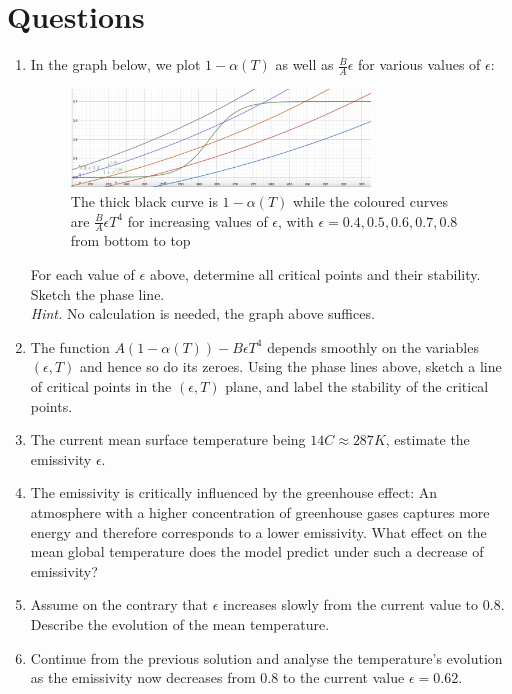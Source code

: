 \documentclass[10pt, letterpaper, answer]{exam}
\begin{document}
\newpage

\section{Questions}

\begin{enumerate}
\item In the graph below, we plot $1-\alpha(T)$ as well as $\frac{B}{A}\epsilon$ for various values of $\epsilon$:

\begin{figure}[!h]\begin{center}
    \includegraphics[width=0.75\textwidth]{Bifurcation.png}
    \caption{The thick black curve is $1-\alpha(T)$ while the coloured curves are $\frac{B}{A}\epsilon T^4$ for increasing values of $\epsilon$, with $\epsilon =0.4,0.5,0.6,0.7,0.8$ from bottom to top} 
\end{center}
\label{TheGraph}\end{figure} 

For each value of $\epsilon$ above, determine all critical points and their stability. Sketch the phase line. \\ \emph{Hint.} No calculation is needed, the graph above suffices. 






    
\item The function $A(1-\alpha(T))-B\epsilon T^4$ depends smoothly on the variables $(\epsilon,T)$ and hence so do its zeroes. Using the phase lines above, sketch a line of critical points in the $(\epsilon,T)$ plane, and label the stability of the critical points.


\item The current mean surface temperature being $14C\approx 287K$, estimate the emissivity $\epsilon$.

\item The emissivity is critically influenced by the greenhouse effect: An atmosphere with a higher concentration of greenhouse gases captures more energy and therefore corresponds to a lower emissivity. What effect on the mean global temperature does the model predict under such a decrease of emissivity?

\item Assume on the contrary that $\epsilon$ increases slowly from the current value to $0.8$. Describe the evolution of the mean temperature.

\item Continue from the previous solution and analyse the temperature's evolution as the emissivity now decreases from 0.8 to the current value $\epsilon = 0.62$.

 
\end{enumerate}
\end{document}
